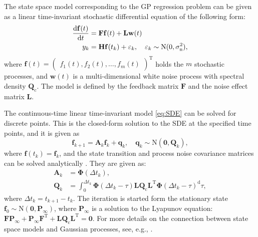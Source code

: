 \documentclass[twoside,11pt]{article}
\begin{document}
The state space model corresponding to the GP regression problem can be given as
a linear time-invariant stochastic differential equation of the following form:
%
\begin{align} \label{eq:SDE}
  \begin{split}
  {\mathrm{d} \mathbf{f}(t) \over \mathrm{d} t} 
    &= \mathbf{F} \mathbf{f}(t) + \mathbf{L} \mathbf{w}(t) \\
  y_k 
    &= \mathbf{H} \mathbf{f}(t_k) + \varepsilon_k, 
    \quad \varepsilon_k \sim \mathrm{N}(0,\sigma_\mathrm{n}^2),
  \end{split}
\end{align}
%
where $\mathbf{f}(t) = \begin{pmatrix} f_1(t), f_2(t), \ldots, f_m(t)
\end{pmatrix}^\mathrm{T}$ holds the $m$ stochastic processes, and
$\mathbf{w}(t)$ is a multi-dimensional white noise process with spectral density
$\mathbf{Q}_\mathrm{c}$. The model is defined by the feedback matrix
$\mathbf{F}$ and the noise effect matrix $\mathbf{L}$.

The continuous-time linear time-invariant model \eqref{eq:SDE} can be solved for
discrete points. This is the closed-form solution to the SDE at the specified
time points, and it is given as
%
\begin{equation} \label{eq:state-space}
  \mathbf{f}_{k+1} = \mathbf{A}_k \mathbf{f}_k + \mathbf{q}_k, 
  \quad \mathbf{q}_k \sim \mathrm{N}(\mathbf{0}, \mathbf{Q}_k),
\end{equation}
%
where $\mathbf{f}(t_k) = \mathbf{f}_k$, and the state transition and process
noise covariance matrices can be solved analytically \citep[see,
e.g.,][]{Sarkka+Solin+Hartikainen:2013}. They are given as:
%
\begin{align}
  \mathbf{A}_k &= \mathbf{\Phi}(\Delta t_k), \\
  \mathbf{Q}_k &= \int_{0}^{\Delta t_k} 
    \mathbf{\Phi}(\Delta t_k-\tau)
    \mathbf{L} \mathbf{Q}_\mathrm{c} \mathbf{L}^\mathrm{T} 
    \mathbf{\Phi}(\Delta t_k-\tau)^ \mathrm{d} \tau,
\end{align}
%
where $\Delta t_k = t_{k+1}-t_k$. The iteration is started form the stationary
state $\mathbf{f}_0 \sim \mathrm{N}(\mathbf{0},\mathbf{P}_\infty)$, where
$\mathbf{P}_\infty$ is a solution to the Lyapunov equation: $\mathbf{F}
\mathbf{P}_\infty + \mathbf{P}_\infty \mathbf{F}^\mathrm{T} + \mathbf{L}
\mathbf{Q}_\mathrm{c} \mathbf{L}^\mathrm{T} = \mathbf{0}$. For more details on
the connection between state space models and Gaussian processes, see, e.g.,
\citet{Sarkka+Solin+Hartikainen:2013}.
\end{document}
